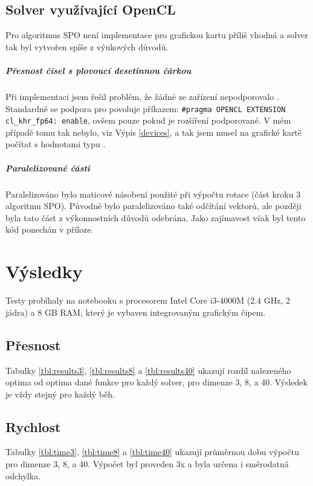 \documentclass[12pt, a4paper]{report}
\begin{document}


\section{Solver využívající OpenCL}
Pro algoritmus SPO není implementace pro grafickou kartu příliš vhodná a solver tak byl vytvořen spíše z výukových důvodů.

\paragraph{Přesnost čísel s plovoucí desetinnou čárkou}
Při implementaci jsem řešil problém, že žádné ze zařízení nepodporovalo .
Standardně se podpora pro  povoluje příkazem: \verb|#pragma OPENCL EXTENSION cl_khr_fp64: enable|, ovšem po\-uze pokud je rozšíření  podporované.
V mém případě tomu tak nebylo, viz Výpis \ref{devices}, a tak jsem musel na grafické kartě počítat s hodnotami typu .



\paragraph{Paralelizované části}
Paralelizováno bylo maticové násobení použité při výpočtu rotace (část kroku 3 algoritmu SPO).
Původně bylo paralelizováno také odčítání vektorů, ale později byla tato část z výkonnostních důvodů odebrána.
Jako zajímavost však byl tento kód ponechán v příloze.

\chapter{Výsledky}
Testy probíhaly na notebooku s procesorem Intel Core i3-4000M (2.4 GHz, 2 jádra) a 8 GB RAM, který je vybaven integrovaným grafickým čipem.

\section{Přesnost}
Tabulky \ref{tbl:results3}, \ref{tbl:results8} a \ref{tbl:results40} ukazují rozdíl nalezeného optima od optima dané funkce pro každý solver, pro dimenze 3, 8, a 40.
Výsledek je vždy stejný pro každý běh.

\section{Rychlost}
Tabulky \ref{tbl:time3}, \ref{tbl:time8} a \ref{tbl:time40} ukazují průměrnou dobu výpočtu pro dimenze 3, 8, a 40.
Výpočet byl proveden 3x a byla určena i směrodatná odchylka.
\end{document}

